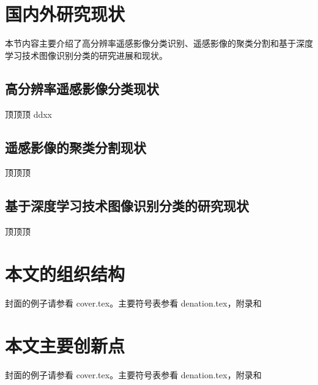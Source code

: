\section{国内外研究现状}
\label{sec:second}
本节内容主要介绍了高分辨率遥感影像分类识别、遥感影像的聚类分割和基于深度学习技术\citep{hinton2006fast, bengio2009learning, NIPS2012_4824}图像识别分类的研究进展和现状。

\subsection{高分辨率遥感影像分类现状}
\label{subsec:1-2-1}
顶顶顶
ddxx
\subsection{遥感影像的聚类分割现状}
\label{subsec:1-2-2}
顶顶顶

\subsection{基于深度学习技术图像识别分类的研究现状}
\label{subsec:1-2-3}
顶顶顶

\section{本文的组织结构}
\label{sec:third}
封面的例子请参看 cover.tex。主要符号表参看 denation.tex，附录和

\section{本文主要创新点}
\label{sec:forth}
封面的例子请参看 cover.tex。主要符号表参看 denation.tex，附录和
